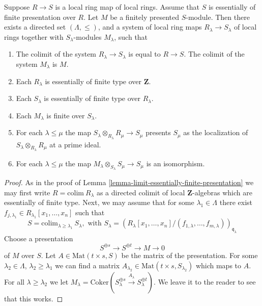 \begin{lemma}
\label{lemma-limit-module-essentially-finite-presentation}
Suppose $R \to S$ is a local ring map of local rings.
Assume that $S$ is essentially of finite presentation over $R$.
Let $M$ be a finitely presented $S$-module.
Then there exists a directed set $(\Lambda, \leq)$, and
a system of local ring maps $R_\lambda \to S_\lambda$
of local rings together with $S_\lambda$-modules $M_\lambda$,
such that
\begin{enumerate}
\item The colimit of the system $R_\lambda \to S_\lambda$
is equal to $R \to S$. The colimit of the system $M_\lambda$
is $M$.
\item Each $R_\lambda$ is essentially of finite type
over $\mathbf{Z}$.
\item Each $S_\lambda$ is essentially of finite type
over $R_\lambda$.
\item Each $M_\lambda$ is finite over $S_\lambda$.
\item For each $\lambda \leq \mu$ the map
$S_\lambda \otimes_{R_\lambda} R_\mu \to S_\mu$
presents $S_\mu$ as the localization of
$S_\lambda \otimes_{R_\lambda} R_\mu$
at a prime ideal.
\item For each $\lambda \leq \mu$ the map
$M_\lambda \otimes_{S_\lambda} S_\mu \to S_\mu$
is an isomorphism.
\end{enumerate}
\end{lemma}

\begin{proof}
As in the proof of Lemma \ref{lemma-limit-essentially-finite-presentation}
we may first write $R = \text{colim}\ R_\lambda$ as a directed colimit
of local $\mathbf{Z}$-algebras which are essentially of finite type.
Next, we may assume that for some $\lambda_1 \in \Lambda$ there
exist $f_{j, \lambda_1} \in R_{\lambda_1}[x_1,\ldots,x_n]$
such that
$$
S =
\text{colim}_{\lambda \geq \lambda_1}\ S_\lambda, \text{ with }
S_\lambda = 
(R_\lambda[x_1,\ldots,x_n]/(f_{1,\lambda},\ldots,f_{m,\lambda}))_{\mathfrak 
q_\lambda}
$$
Choose a presentation
$$
S^{\oplus s} \to S^{\oplus t} \to M \to 0
$$
of $M$ over $S$. Let $A \in \text{Mat}(t\times s, S)$ be
the matrix of the presentation. For some $\lambda_2 \in \Lambda$,
$\lambda_2 \geq \lambda_1$
we can find a matrix $A_{\lambda_2} \in \text{Mat}(t\times s, S_{\lambda_2})$
which maps to $A$. For all $\lambda \geq \lambda_2$ we let
$M_\lambda = \text{Coker}(S_\lambda^{\oplus s} \xrightarrow{A_\lambda}
S_\lambda^{\oplus t})$. We leave it to the reader to see that
this works.
\end{proof}

